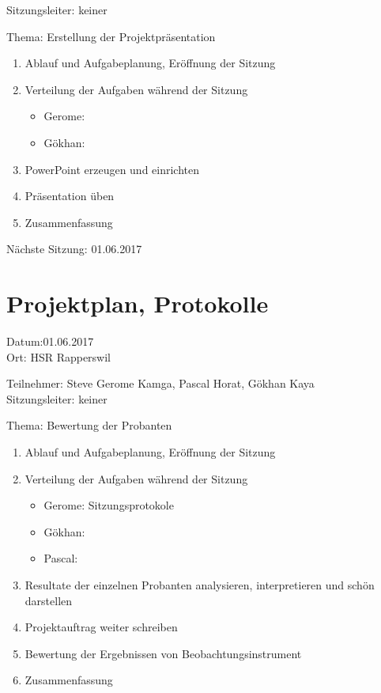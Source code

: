 Sitzungsleiter: keiner

Thema: Erstellung der Projektpräsentation
\begin{enumerate}

\item Ablauf und Aufgabeplanung, Eröffnung der Sitzung 

\item  Verteilung der Aufgaben während der Sitzung
\begin{itemize}
\item Gerome: 
\item Gökhan: 
\end{itemize}

\item PowerPoint erzeugen und einrichten

\item Präsentation üben


\item Zusammenfassung

\end{enumerate}

Nächste Sitzung: 01.06.2017



\newpage
\section*{Projektplan, Protokolle}

Datum:01.06.2017\\
Ort: HSR Rapperswil

Teilnehmer: Steve Gerome Kamga, Pascal Horat, Gökhan Kaya\\
Sitzungsleiter: keiner

Thema: Bewertung der Probanten
\begin{enumerate}

\item Ablauf und Aufgabeplanung, Eröffnung der Sitzung 

\item  Verteilung der Aufgaben während der Sitzung
\begin{itemize}
\item Gerome: Sitzungsprotokole
\item Gökhan: 
\item Pascal: 
\end{itemize}



\item Resultate der einzelnen Probanten analysieren, interpretieren und schön darstellen 		

\item 	Projektauftrag weiter schreiben

\item 	Bewertung der Ergebnissen von Beobachtungsinstrument


\item Zusammenfassung

\end{enumerate}

